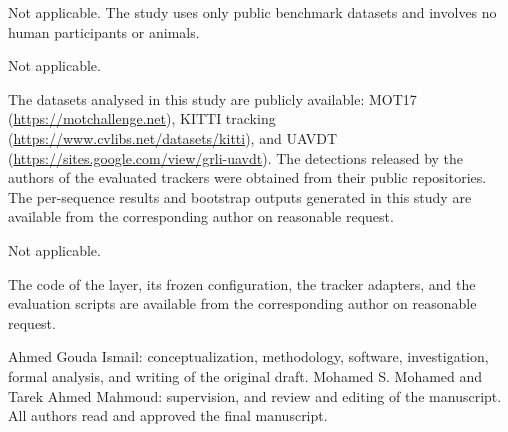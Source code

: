 \documentclass[pdflatex,referee,sn-mathphys-num]{sn-jnl}
\begin{document}
Not applicable. The study uses only public benchmark datasets and involves no human participants
or animals.

Not applicable.

The datasets analysed in this study are publicly available: MOT17
(\url{https://motchallenge.net}), KITTI tracking (\url{https://www.cvlibs.net/datasets/kitti}), and UAVDT
(\url{https://sites.google.com/view/grli-uavdt}).
The detections released by the authors of the evaluated trackers were obtained from their public
repositories. The per-sequence results and bootstrap outputs generated in this study are available
from the corresponding author on reasonable request.

Not applicable.

The code of the layer, its frozen configuration, the tracker adapters, and the evaluation scripts
are available from the corresponding author on reasonable request.

Ahmed Gouda Ismail: conceptualization, methodology, software, investigation, formal analysis, and
writing of the original draft. Mohamed S. Mohamed and Tarek Ahmed Mahmoud: supervision, and
review and editing of the manuscript. All authors read and approved the final manuscript.

\end{document}
